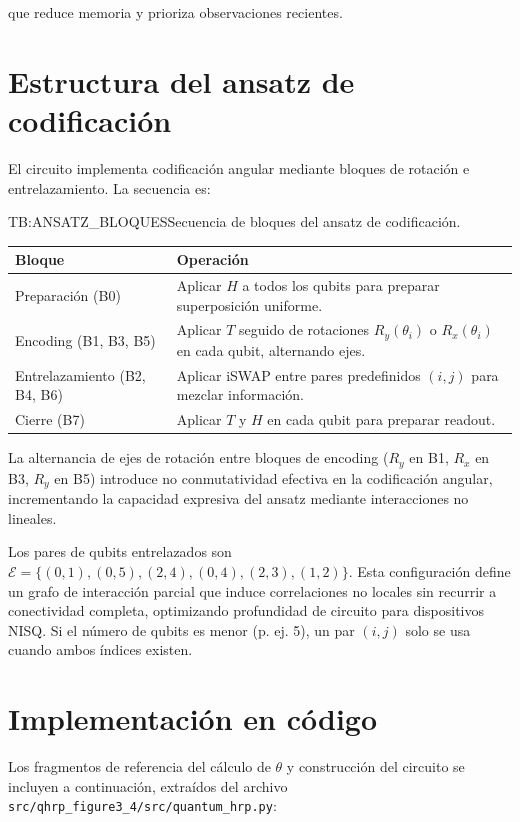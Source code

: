que reduce memoria y prioriza observaciones recientes.

\section{Estructura del ansatz de codificación}
\label{ap:estructura_ansatz}

El circuito implementa codificación angular mediante bloques de rotación e entrelazamiento. La secuencia es:

\begin{table}[Bloques del ansatz]{TB:ANSATZ_BLOQUES}{Secuencia de bloques del ansatz de codificación.}
\begin{tabular}{p{2.5cm}p{10.0cm}}
    \textbf{Bloque} & \textbf{Operación} \\
    \hline
    Preparación (B0) & Aplicar $H$ a todos los qubits para preparar superposición uniforme. \\
    Encoding (B1, B3, B5) & Aplicar $T$ seguido de rotaciones $R_y(\theta_i)$ o $R_x(\theta_i)$ en cada qubit, alternando ejes. \\
    Entrelazamiento (B2, B4, B6) & Aplicar iSWAP entre pares predefinidos $(i,j)$ para mezclar información. \\
    Cierre (B7) & Aplicar $T$ y $H$ en cada qubit para preparar readout. \\
\end{tabular}
\end{table}

La alternancia de ejes de rotación entre bloques de encoding ($R_y$ en B1, $R_x$ en B3, $R_y$ en B5) introduce no conmutatividad efectiva en la codificación angular, incrementando la capacidad expresiva del ansatz mediante interacciones no lineales.

Los pares de qubits entrelazados son $\mathcal{E} = \{(0,1), (0,5), (2,4), (0,4), (2,3), (1,2)\}$. Esta configuración define un grafo de interacción parcial que induce correlaciones no locales sin recurrir a conectividad completa, optimizando profundidad de circuito para dispositivos NISQ. Si el número de qubits es menor (p. ej. 5), un par $(i,j)$ solo se usa cuando ambos índices existen.

\section{Implementación en código}
\label{ap:codigo_theta_ansatz}

Los fragmentos de referencia del cálculo de $\theta$ y construcción del circuito se incluyen a continuación, extraídos del archivo \texttt{src/qhrp\_figure3\_4/src/quantum\_hrp.py}:


